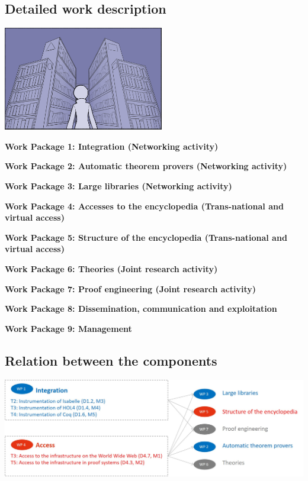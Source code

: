 \subsection{Detailed work description}

\begin{center}
\includegraphics[width=7cm]{Illustration4_Color.jpg}
\end{center}

\begin{workplan}


  \newcommand\na{(Networking activity)}
  \newcommand\tnva{(Trans-national and virtual access)}
  \newcommand\jra{(Joint research activity)}
  \newcommand\titlewp[3]{\bigskip\noindent\colorbox{color3}{\begin{minipage}\textwidth\bf Work Package #1: #2\end{minipage}}}

\titlewp{1}{Integration \na}{instrumentation}

\titlewp{2}{Automatic theorem provers \na}{atpetc}

\titlewp{3}{Large libraries \na}{libraries}

\titlewp{4}{Accesses to the encyclopedia \tnva}{access}

\titlewp{5}{Structure of the encyclopedia \tnva}{structuring}

\titlewp{6}{Theories \jra}{theories}

\titlewp{7}{Proof engineering \jra}{alignment}

\titlewp{8}{Dissemination, communication and exploitation}{dissemination}

\titlewp{9}{Management}{management}

\end{workplan}



\subsection{Relation between the components}

\includegraphics[width=\textwidth]{PERT}




